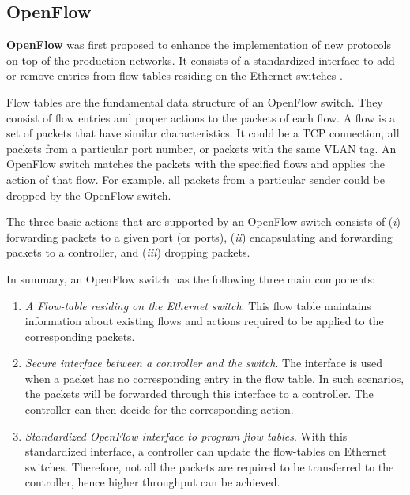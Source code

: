 

\subsection{OpenFlow}
\label{OpenFlow}
\textbf{OpenFlow} was first proposed to enhance the implementation of new protocols on top of the production networks. It consists of a standardized interface to add or remove entries from flow tables residing on the Ethernet switches \cite{mckeown2008openflow}.

Flow tables are the fundamental data structure of an OpenFlow switch. They consist of flow entries and proper actions to the packets of each flow. A flow is a set of packets that have similar characteristics. It could be a TCP connection, all packets from a particular port number, or packets with the same VLAN tag. An OpenFlow switch matches the packets with the specified flows and applies the action of that flow. 
For example, all packets from a particular sender could be dropped by the OpenFlow switch. 

The three basic actions that are supported by an OpenFlow switch consists of (\emph{i}) forwarding packets to a given port (or ports), (\emph{ii}) encapsulating and forwarding packets to a controller, and (\emph{iii}) dropping packets.


In summary, an OpenFlow switch has the following three main components:
\begin{enumerate}
    \item \emph{A Flow-table residing on the Ethernet switch}: This flow table 
    maintains information about existing flows and actions required
    to be applied to the corresponding packets.
    \item \emph{Secure interface between a controller and the switch}.
    The interface is used when a packet has no corresponding 
    entry in the flow table. In such scenarios, the packets will 
    be forwarded through this interface to a controller. The controller
    can then decide for the corresponding action.
    \item \emph{Standardized OpenFlow interface to program flow tables}. 
    With this standardized interface, a controller can update the flow-tables 
    on Ethernet switches. Therefore, not all the packets are required to 
    be transferred to the controller, hence higher throughput can be achieved. 
\end{enumerate}

